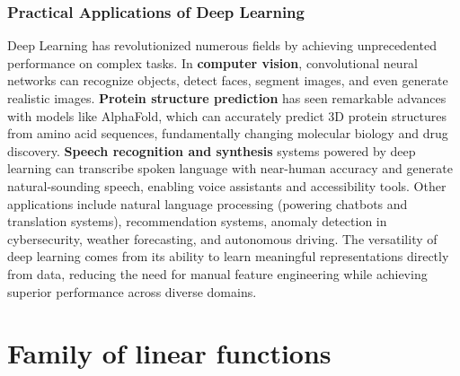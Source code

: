 



\subsubsection{Practical Applications of Deep Learning}

Deep Learning has revolutionized numerous fields by achieving unprecedented performance on complex tasks. In \textbf{computer vision}, convolutional neural networks can recognize objects, detect faces, segment images, and even generate realistic images. \textbf{Protein structure prediction} has seen remarkable advances with models like AlphaFold, which can accurately predict 3D protein structures from amino acid sequences, fundamentally changing molecular biology and drug discovery. \textbf{Speech recognition and synthesis} systems powered by deep learning can transcribe spoken language with near-human accuracy and generate natural-sounding speech, enabling voice assistants and accessibility tools. Other applications include natural language processing (powering chatbots and translation systems), recommendation systems, anomaly detection in cybersecurity, weather forecasting, and autonomous driving. The versatility of deep learning comes from its ability to learn meaningful representations directly from data, reducing the need for manual feature engineering while achieving superior performance across diverse domains.

\section{Family of linear functions}

